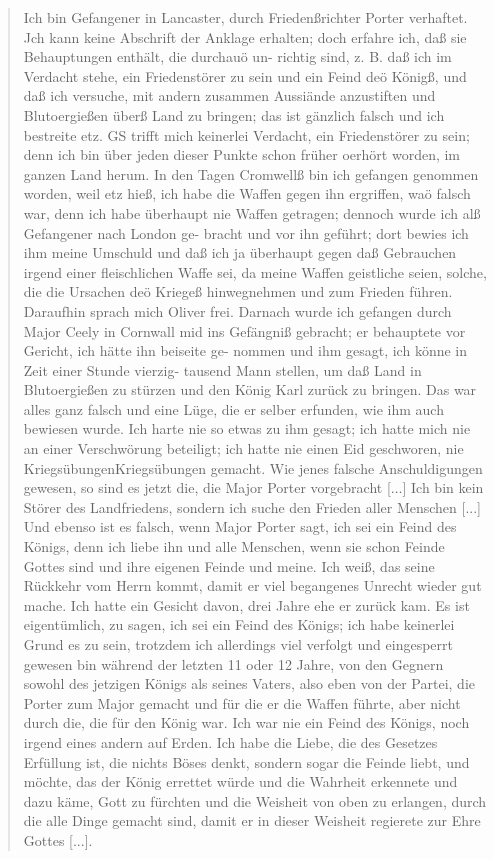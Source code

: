 \bigskip \begin{quote}

  Ich bin Gefangener in Lancaster, durch Friedenßrichter
  Porter verhaftet. Jch kann keine Abschrift der Anklage erhalten;
  doch erfahre ich, daß sie Behauptungen enthält, die durchauö un-
  richtig sind, z. B. daß ich im Verdacht stehe, ein Friedenstörer
  zu sein und ein Feind deö Königß, und daß ich versuche, mit
  andern zusammen Aussiände anzustiften und Blutoergießen überß
  Land zu bringen; das ist gänzlich falsch und ich bestreite etz. GS
  trifft mich keinerlei Verdacht, ein Friedenstörer zu sein; denn
  ich bin über jeden dieser Punkte schon früher oerhört worden, im
  ganzen Land herum. In den Tagen Cromwellß bin ich gefangen
  genommen worden, weil etz hieß, ich habe die Waffen gegen ihn
  ergriffen, waö falsch war, denn ich habe überhaupt nie Waffen
  getragen; dennoch wurde ich alß Gefangener nach London ge-
  bracht und vor ihn geführt; dort bewies ich ihm meine Umschuld
  und daß ich ja überhaupt gegen daß Gebrauchen irgend einer
  fleischlichen Waffe sei, da meine Waffen geistliche seien, solche,
  die die Ursachen deö Kriegeß hinwegnehmen und zum Frieden
  führen. Daraufhin sprach mich Oliver frei. Darnach wurde ich
  gefangen durch Major Ceely in Cornwall mid ins Gefängniß
  gebracht; er behauptete vor Gericht, ich hätte ihn beiseite ge-
  nommen und ihm gesagt, ich könne in Zeit einer Stunde vierzig-
  tausend Mann stellen, um daß Land in Blutoergießen zu stürzen
  und den König Karl zurück zu bringen. Das war alles ganz
  falsch und eine Lüge, die er selber erfunden, wie ihm auch bewiesen 
  wurde. Ich harte nie so etwas zu ihm gesagt; ich hatte
  mich nie an einer Verschwörung beteiligt; ich hatte nie einen Eid
  geschworen, nie Kriegsübungen\indexname{Kriegsübungen} gemacht. Wie jenes falsche 
  Anschuldigungen gewesen, so sind es jetzt die, die Major Porter 
  vorgebracht [...] Ich bin kein Störer des Landfriedens, sondern
  ich suche den Frieden aller Menschen [...] Und ebenso ist es
  falsch, wenn Major Porter sagt, ich sei ein Feind des Königs,
  denn ich liebe ihn und alle Menschen, wenn sie schon Feinde
  Gottes sind und ihre eigenen Feinde und meine. Ich weiß, das
  seine Rückkehr vom Herrn kommt, damit er viel begangenes Unrecht 
  wieder gut mache. Ich hatte ein Gesicht davon, drei Jahre
  ehe er zurück kam. Es ist eigentümlich, zu sagen, ich sei ein
  Feind des Königs; ich habe keinerlei Grund es zu sein, trotzdem
  ich allerdings viel verfolgt und eingesperrt gewesen bin während
  der letzten 11 oder 12 Jahre, von den Gegnern sowohl des
  jetzigen Königs als seines Vaters, also eben von der Partei, die
  Porter zum Major gemacht und für die er die Waffen führte,
  aber nicht durch die, die für den König war. Ich war nie ein
  Feind des Königs, noch irgend eines andern auf Erden. Ich
  habe die Liebe, die des Gesetzes Erfüllung ist, die nichts Böses
  denkt, sondern sogar die Feinde liebt, und möchte, das der König
  errettet würde und die Wahrheit erkennete und dazu käme, Gott
  zu fürchten und die Weisheit von oben zu erlangen, durch die
  alle Dinge gemacht sind, damit er in dieser Weisheit regierete zur
  Ehre Gottes [...].


\end{quote}
